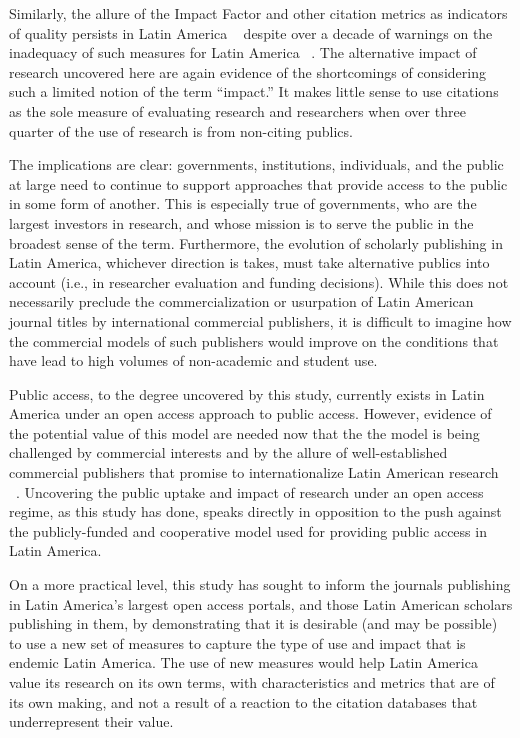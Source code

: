Similarly, the allure of the Impact Factor and other citation metrics as indicators of quality persists in Latin America ~\citep{Vessuri2013} despite over a decade of warnings on the inadequacy of such measures for Latin America ~\citep{Cetto1998}. The alternative impact of research uncovered here are again evidence of the shortcomings of considering such a limited notion of the term ``impact.'' It makes little sense to use citations as the sole measure of evaluating research and researchers when over three quarter of the use of research is from non-citing publics.

The implications are clear: governments, institutions, individuals, and the public at large need to continue to support approaches that provide access to the public in some form of another. This is especially true of governments, who are the largest investors in research, and whose mission is to serve the public in the broadest sense of the term. Furthermore, the evolution of scholarly publishing in Latin America, whichever direction is takes, must take alternative publics into account (i.e., in researcher evaluation and funding decisions). While this does not necessarily preclude the commercialization or usurpation of Latin American journal titles by international commercial publishers, it is difficult to imagine how the commercial models of such publishers would improve on the conditions that have lead to high volumes of non-academic and student use.

Public access, to the degree uncovered by this study, currently exists in Latin America under an open access approach to public access. However, evidence of the potential value of this model are needed now that the the model is being challenged by commercial interests and by the allure of well-established commercial publishers that promise to internationalize Latin American research ~\citep{deMelloRode2014,Packer2014}. Uncovering the public uptake and impact of research under an open access regime, as this study has done, speaks directly in opposition to the push against the publicly-funded and cooperative model used for providing public access in Latin America.

On a more practical level, this study has sought to inform the journals publishing in Latin America's largest open access portals, and those Latin American scholars publishing in them, by demonstrating that it is desirable (and may be possible) to use a new set of measures to capture the type of use and impact that is endemic Latin America. The use of new measures would help Latin America value its research on its own terms, with characteristics and metrics that are of its own making, and not a result of a reaction to the citation databases that underrepresent their value.

